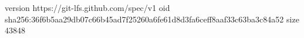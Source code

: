 version https://git-lfs.github.com/spec/v1
oid sha256:36f6b5aa29db07c66b45ad7f25260a6fe61d8d3fa6ceff8aaf33c63ba3c84a52
size 43848
